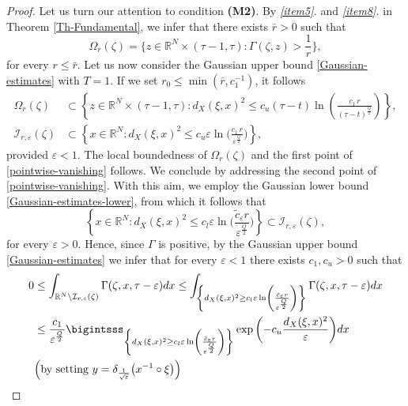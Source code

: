 \documentclass[11pt,a4paper]{article}
\numberwithin{equation}{section}
\newcommand{\R}{\mathbb{R}}
\def \G {{\Gamma}}
\def \d {{\delta}}
\def \e {{\varepsilon}}
\def \t {{\tau}}
\def \x {{\xi}}
\def \z {{\zeta}}
\def \O {{\Omega}}
\begin{document}
{\begin{proof}
		
	\medskip
	Let us turn our attention to condition \textbf{(M2)}. By \emph{\ref{item5}.} and \emph{\ref{item8}.} in Theorem \ref{Th-Fundamental}, we infer that there exists $\bar r>0$ such that 
	\begin{equation}\label{portopalo-di-capo-passero}
		\Omega_r(\z)= \biggl\{ z \in \R^N \times (\t-1,\t): \Gamma(\z,z)>\frac{1}{r}\biggr\},
	\end{equation}
	for every $r\leq \bar r$. Let us now consider the Gaussian upper bound \eqref{Gaussian-estimates} with $T=1$. If we set $r_0\leq\min\left(\bar r,c_1^{-1}\right)$, it follows 
	\begin{equation}
		\begin{aligned}
			\Omega_r(\z)&\subset \left\{ z \in \R^N \times (\t-1,\t): d_X(\x,x)^2\leq c_u(\t-t) \ln\left(\frac{c_1\,r }{(\t-t)^\frac{Q}{2}}\right) \right\},\\
			\mathcal{I}_{r,\e}(\z)&\subset \left\{ x \in \R^N : d_X(\x,x)^2\leq c_u\e\ln\Bigg(\frac{c_1\,r }{ \e^\frac{Q}{2}}\Bigg) \right\},
		\end{aligned}
	\end{equation}
	provided $\e<1$. The local boundedness of $\O_r(\z)$ and the first point of \eqref{pointwise-vanishing} follows. We conclude by addressing the second point of \eqref{pointwise-vanishing}. With this aim, we employ the Gaussian lower bound \eqref{Gaussian-estimates-lower}, from which it follows that
	\begin{equation}
		\left\{ x \in \R^N : d_X(\x,x)^2\leq c_l\e \ln\Bigg(\frac{\tilde c_\e r}{\e^\frac{Q}{2}}\Bigg) \right\}\subset \mathcal{I}_{r,\e}(\z),
	\end{equation}
	for every $\e>0$. Hence, since $\G$ is positive, by the Gaussian upper bound \eqref{Gaussian-estimates} we infer that for every $\e<1$ there exists $c_1,c_u>0$ such that
	\begin{equation}
		\begin{aligned}
			0&\leq \int_{\R^N \backslash \mathcal{I}_{r, \varepsilon} (\z)} \Gamma(\z,x,\t - \varepsilon) d x \leq \int_{\left\{d_X(\x,x)^2\geq c_l\e \ln\left(\frac{\tilde c_\e r}{ \e^\frac{Q}{2}}\right) \right\}}  \Gamma(\z,x,\t - \varepsilon) d x\\
			&\leq\frac{c_1}{\e^\frac{Q}{2}} \bigintsss_{\left\{d_X(\x,x)^2\geq c_l\e \ln\left(\frac{\tilde c_\e r}{\e^\frac{Q}{2}}\right) \right\}} \exp{\left(-c_u\frac{d_X(\x,x)^2}{\e}\right)} dx \\
			&\Big(\text{by setting }y= \d_{\frac{1}{\sqrt{\e}}}\big(x^{-1}\circ \x\big)\Big)\\

\end{aligned}
\end{equation}
\end{proof}}
\end{document}
